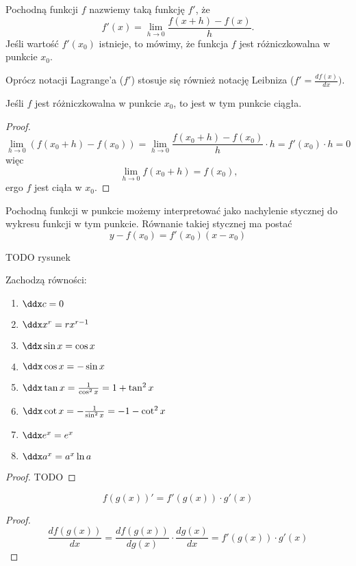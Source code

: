 \begin{definition}
    Pochodną funkcji $f$ nazwiemy taką funkcję $f'$, że
    \[ f'(x) = \lim_{h\to 0}\frac{f(x + h) - f(x)}{h}. \]
    Jeśli wartość $f'(x_0)$ istnieje, to mówimy, że funkcja $f$ jest różniczkowalna w punkcie $x_0$.
\end{definition}

Oprócz notacji Lagrange'a ($f'$) stosuje się również notację Leibniza ($f' = \frac{df(x)}{dx})$.

\begin{theorem}
    Jeśli $f$ jest różniczkowalna w punkcie $x_0$, to jest w tym punkcie ciągła.
\end{theorem}
\begin{proof}
    \[ \lim_{h \to 0}(f(x_0 + h) - f(x_0)) = \lim_{h \to 0}\frac{f(x_0 + h) - f(x_0)}{h} \cdot h = f'(x_0) \cdot h = 0 \]
    więc
    \[\ \lim_{h\to 0}f(x_0 + h) = f(x_0), \]
    ergo $f$ jest ciąła w $x_0$.
\end{proof}

Pochodną funkcji w punkcie możemy interpretować jako nachylenie stycznej do wykresu funkcji w tym punkcie. Równanie takiej stycznej ma postać
\begin{equation}
    y - f(x_0) = f'(x_0)(x - x_0)
\end{equation}

TODO rysunek

\begin{theorem}
    Zachodzą równości:
    \begin{enumerate}
        \item $\ddx c = 0$
        \item $\ddx x^r = rx^{r-1}$
        \item $\ddx \sin x = \cos x$
        \item $\ddx \cos x = -\sin x$
        \item $\ddx \tan x = \frac{1}{\cos^2 x} = 1 + \tan^2 x$
        \item $\ddx \cot x = - \frac{1}{\sin^2 x} = -1 - \cot^2 x$
        \item $\ddx e^x = e^x$
        \item $\ddx a^x = a^x \ln a$
    \end{enumerate}
\end{theorem}
\begin{proof}
    TODO
\end{proof}

\begin{theorem}
    \[ f(g(x))' = f'(g(x)) \cdot g'(x) \]
\end{theorem}
\begin{proof}
    \[ \frac{df(g(x))}{dx} = \frac{df(g(x))}{dg(x)}\cdot\frac{dg(x)}{dx} = f'(g(x)) \cdot g'(x) \]
\end{proof}

